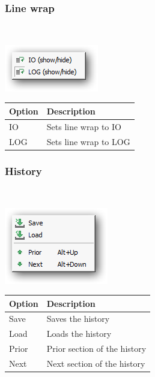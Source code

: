 \newpage
\hypertarget{menu_r_rterm_linewrap}{}
\subsubsection{Line wrap}\\

\includegraphics[scale=0.50]{./res/menu_r_rterm_linewrap.png}\\

\begin{scriptsize}\begin{tabularx}{\textwidth}{>{\hsize=0.3\hsize}X>{\hsize=0.7\hsize}X}\\
    \hline
    \textbf{Option} & \textbf{Description} \\
    \hline
    IO & Sets line wrap to IO \\
    LOG & Sets line wrap to LOG \\
    \hline
  \end{tabularx}\end{scriptsize}


\hypertarget{menu_r_rterm_history}{}
\subsubsection{History}\\

\includegraphics[scale=0.50]{./res/menu_r_rterm_history.png}\\

\begin{scriptsize}\begin{tabularx}{\textwidth}{>{\hsize=0.3\hsize}X>{\hsize=0.7\hsize}X}\\
    \hline
    \textbf{Option} & \textbf{Description} \\
    \hline
    Save & Saves the history \\
    Load & Loads the history \\
    Prior & Prior section of the history \\
    Next & Next section of the history \\
    \hline
  \end{tabularx}\end{scriptsize}


